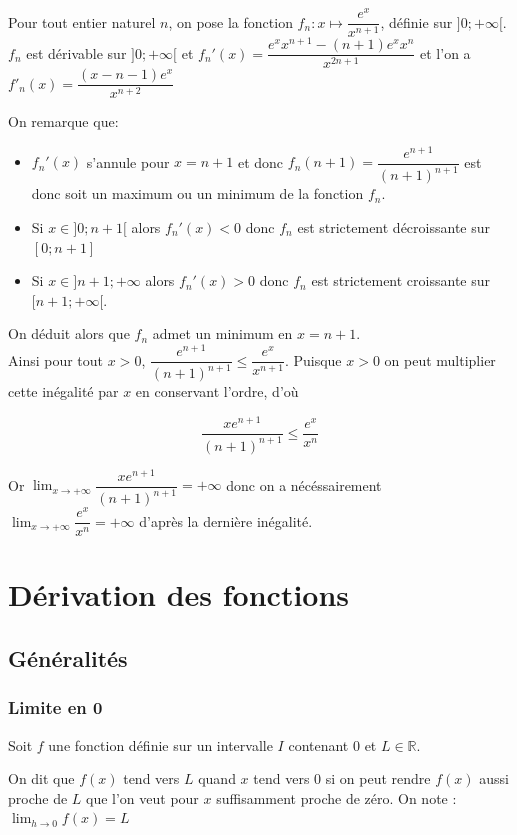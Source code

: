 \documentclass[french]{book}
\newcommand{\R}{\mathbb {R}}
\newcommand{\ie}{\leq}
\newcommand{\ds}{\displaystyle}
\newcommand{\limo}[1][x]{\ds\lim_{#1\rightarrow 0}}
\newcommand{\limpinf}[1][x]{\ds\lim_{#1\rightarrow +\infty}}
\begin{document}
\begin{demo}
Pour tout entier naturel $n$, on pose la fonction $f_n: x \mapsto \dfrac{e^x}{x^{n+1}}$, définie sur $]0;+ \infty[$. \\

$f_n$ est dérivable sur $]0;+ \infty[$ et $f_n'(x)=\dfrac{e^x x^{n+1}-(n+1)e^x x^n} {x^{2n+1}}$ et l'on a  $f'_n(x)=\dfrac{(x-n-1)e^x}{x^{n+2}}$

On remarque que: 

\begin{itemize}
\item[$\bullet$] $f_n'(x)$ s'annule pour $x=n+1$ et donc $f_n(n+1)=\dfrac{e^{n+1}}{(n+1)^{n+1}}$ est donc soit un maximum ou un minimum de la fonction $f_n$.
\item[$\bullet$] Si $x\in ]0; n+1[$ alors $f_n'(x)<0$ donc $f_n$ est strictement décroissante sur $ [0; n+1]$
\item[$\bullet$] Si $x\in ]n+1;+ \infty$ alors $f_n'(x)>0$ donc $f_n$ est strictement croissante sur $ [n+1;+ \infty[$.\\
\end{itemize}

On déduit alors que $f_n$ admet un minimum en $x=n+1$.\\

Ainsi pour tout $x>0$, $\dfrac{e^{n+1}}{(n+1)^{n+1}} \ie \dfrac{e^x}{x^{n+1}}$. Puisque $x>0$ on peut multiplier cette inégalité par $x$ en conservant l'ordre, d'où

$$\dfrac{xe^{n+1}}{(n+1)^{n+1}} \ie \dfrac{e^x}{x^{n}}$$

Or $\limpinf \dfrac{xe^{n+1}}{(n+1)^{n+1}} = + \infty$ donc on a nécéssairement $\limpinf  \dfrac{e^x}{x^{n}} = + \infty$ d'après la dernière inégalité.

\end{demo}
\chapter{Dérivation des fonctions}
\section{Généralités}
\subsection{Limite en 0}
\begin{defn}
Soit $f$ une fonction définie sur un intervalle $I$ contenant 0 et $L \in \R$.

On dit que $f(x)$ tend vers $L$ quand $x$ tend vers 0 si on peut rendre $f(x)$ aussi proche de $L$ que l'on veut pour $x$ suffisamment proche de zéro. On note : $\limo[h] f(x)=L$
\end{defn}
\end{document}

